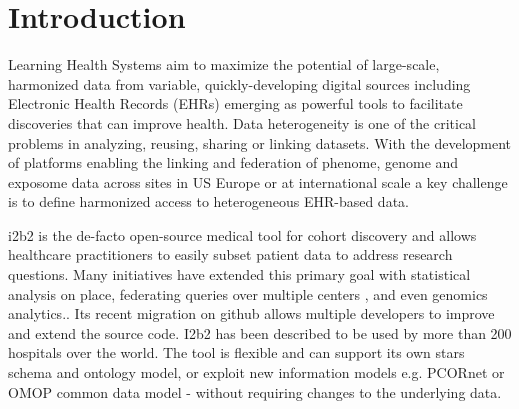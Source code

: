 \documentclass{amia}
\newcommand{\remPierre}[1]{\todo[color=green]{[PZ]{\scriptsize #1\par}}}
\newcommand{\remNico}[1]{\todo[color=orange]{[NP]{\scriptsize #1\par}}}
\begin{document}
\section*{Introduction}
Learning Health Systems aim to maximize the potential of large-scale, harmonized data from variable, quickly-developing digital sources including Electronic Health Records (EHRs) emerging as powerful tools to facilitate discoveries that can improve health. Data heterogeneity is one of the critical problems in analyzing, reusing, sharing or linking datasets. With the development of platforms enabling the linking and federation of phenome, genome and exposome data across sites in US\cite{ref5,ref6} Europe\cite{ref7,ref8} or at international scale\cite{ref9} a key challenge is to define harmonized access to heterogeneous EHR-based data.

i2b2 is the de-facto open-source medical tool for cohort discovery and allows healthcare practitioners to easily subset patient data to address research questions. Many initiatives have extended this primary goal with statistical analysis on place, federating queries over multiple centers\cite{shrine,insite,trinetx} , and even genomics analytics.\cite{transmart,i2b2-transmart}. Its recent migration on github allows multiple developers to improve and extend the source code. I2b2 has been described to be used by more than 200 hospitals over the world. The tool is flexible and can support its own stars schema and ontology model, or exploit new information models e.g. PCORnet\cite{pcornet} or OMOP common data model\cite{ref14} - without requiring changes to the underlying data. 
\end{document}
